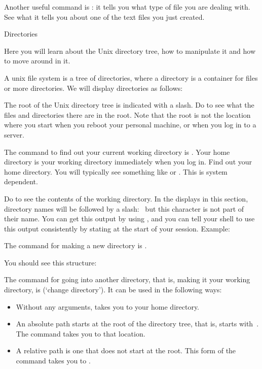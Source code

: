 Another useful command is : it tells you what
type of file you are dealing with. See what it tells you about
one of the text files you just created.

 {Directories}

\begin{purpose}
  Here you will learn about the Unix directory tree, how to manipulate
  it and how to move around in it.
\end{purpose}

A unix file system is a tree of directories, where a directory is a
container for files or more directories. We will display directories
as follows:


The root of the Unix directory tree is indicated with a slash. Do
 to see what the files and directories there are in the
root. Note that the root is not the location where you start when you
reboot your personal machine, or when you log in to a server.

\practical
{The command to find out your current working directory
is . Your home directory is your working directory immediately
when you log in. Find out your home directory.}
{You will typically see something like  or
  . This is system dependent.}{}

Do  to see the contents of the working directory. In the
displays in this section, directory names will be followed by a
slash:~ but this character is not part of their name.  You can
get this output by using , and you can tell your shell to
use this output consistently by stating  at the start of your
session. Example:


The command for making a new directory is .

{You should see this structure:
}{}

The command for going into another directory, that is, making it your
working directory, is  (`change directory'). It can be used in
the following ways:
\begin{itemize}
\item {} Without any arguments,  takes you to your home directory.
\item {} An absolute path starts at the root of
  the directory tree, that is, starts with~\n{/}. The  command
  takes you to that location.
\item {} A relative path is one that does not
  start at the root. This form of the  command takes you to
  .
\end{itemize}

